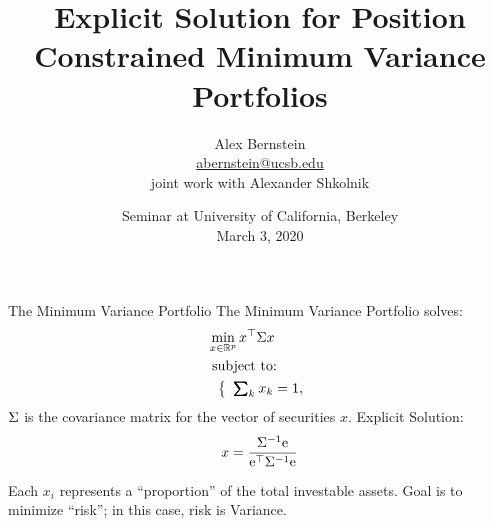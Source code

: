 \documentclass[11pt,leqno]{beamer}
\title{Explicit Solution for Position Constrained 
Minimum Variance Portfolios}
\date{Seminar at University of California, Berkeley\\March 3, 2020}
\author{Alex Bernstein\\
\url{abernstein@ucsb.edu}\\
joint work with Alexander Shkolnik \\ 
}
\institute{
{\it Department of Statistics \& Applied Probability } \\
University of California, Santa Barbara
}
\begin{document}
\ifxetex
  \let\lsum\sum
  \renewcommand{\sum}{\bm{\lsum}}

  \let\lprod\prod
  \renewcommand{\prod}{\bm{\lprod}}
\else
\fi




\begin{frame}
\maketitle
\end{frame}

\newcommand{\af}{Y}
\newcommand{\df}{X}
\begin{frame}{The Minimum Variance Portfolio}
The Minimum Variance Portfolio  solves:
\begin{equation}
\begin{aligned}
 &\min_{x \in \bbr^p} x^\top \Gs x \\
  &\text{ subject to:} \\
  &\hspace{0.08in}\left\{
	\begin{array}{r}
	 \textstyle\sum\nolimits_k \hpt x_k =1 , \\
	\end{array} 
\right. \label{con}
\end{aligned}
\end{equation}
$\Sigma$ is the covariance matrix for the vector of securities $x$.
Explicit Solution:
\begin{equation}
x = \frac{\Sigma^{-1}\mathrm{e}}{\mathrm{e}^\top \Sigma^{-1}\mathrm{e}}
\end{equation}

Each $x_i$ represents a ``proportion'' of the total investable assets.  Goal is to minimize ``risk''; in this case, risk is Variance.  

\end{frame}
\end{document}
